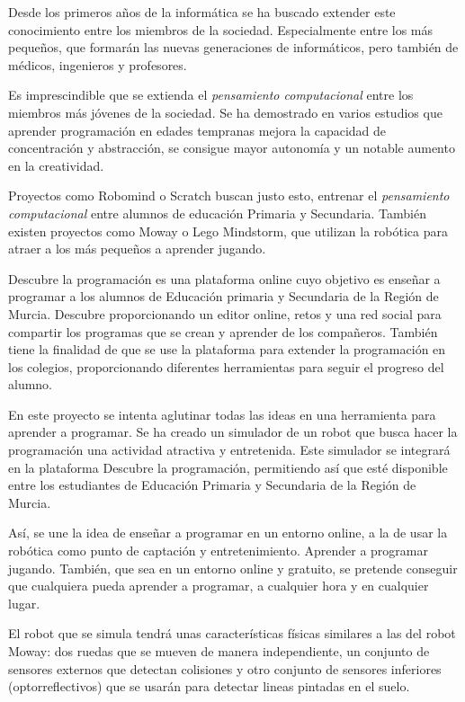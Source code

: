 Desde los primeros años de la informática se ha buscado extender este conocimiento entre los miembros de la sociedad. Especialmente entre los más pequeños, que formarán las nuevas generaciones de informáticos, pero también de médicos, ingenieros y profesores. 

Es imprescindible que se extienda el \emph{pensamiento computacional} entre los miembros más jóvenes de la sociedad. Se ha demostrado en varios estudios que aprender programación en edades tempranas mejora la capacidad de concentración y abstracción, se consigue mayor autonomía y un notable aumento en la creatividad.

Proyectos como Robomind o Scratch buscan justo esto, entrenar el \emph{pensamiento computacional} entre alumnos de educación Primaria y Secundaria. También existen proyectos como Moway o Lego Mindstorm, que utilizan la robótica para atraer a los más pequeños a aprender jugando. 

Descubre la programación es una plataforma online cuyo objetivo es enseñar a programar a los alumnos de Educación primaria y Secundaria de la Región de Murcia. Descubre proporcionando un editor online, retos y una red social para compartir los programas que se crean y aprender de los compañeros. También tiene la finalidad de que se use la plataforma para extender la programación en los colegios, proporcionando diferentes herramientas para seguir el progreso del alumno. 

En este proyecto se intenta aglutinar todas las ideas en una herramienta para aprender a programar. Se ha creado un simulador de un robot que busca hacer la programación una actividad atractiva y entretenida. Este simulador se integrará en la plataforma Descubre la programación, permitiendo así que esté disponible entre los estudiantes de Educación Primaria y Secundaria de la Región de Murcia.

Así, se une la idea de enseñar a programar en un entorno online, a la de usar la robótica como punto de captación y entretenimiento. Aprender a programar jugando. También, que sea en un entorno online y gratuito, se pretende conseguir que cualquiera pueda aprender a programar, a cualquier hora y en cualquier lugar.


El robot que se simula tendrá unas características físicas similares a las del robot Moway: dos ruedas que se mueven de manera independiente, un conjunto de sensores externos que detectan colisiones y otro conjunto de sensores inferiores (optorreflectivos) que se usarán para detectar lineas pintadas en el suelo.

